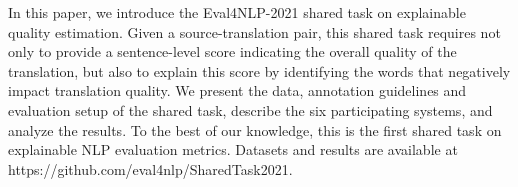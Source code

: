 In this paper, we introduce the Eval4NLP-2021 shared task on explainable quality estimation. Given a source-translation pair, this shared task requires not only to provide a sentence-level score indicating the overall quality of the translation, but also to explain this score by identifying the words that negatively impact translation quality. We present the data, annotation guidelines and evaluation setup of the shared task, describe the six participating systems, and analyze the results. To the best of our knowledge, this is the first shared task on explainable NLP evaluation metrics. Datasets and results are available at https://github.com/eval4nlp/SharedTask2021.
